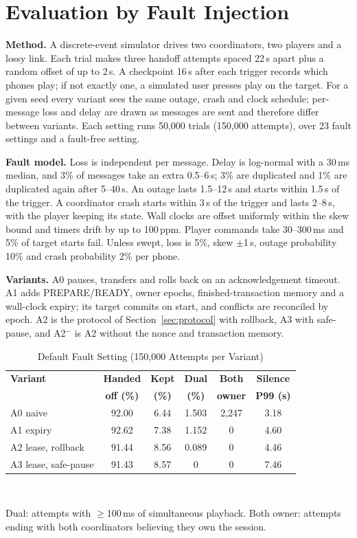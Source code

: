 \documentclass[conference]{IEEEtran}
\begin{document}
\section{Evaluation by Fault Injection}\label{sec:faulteval}

\textbf{Method.} A discrete-event simulator drives two coordinators, two players and a lossy link. Each trial makes three handoff attempts spaced 22\,s apart plus a random offset of up to 2\,s. A checkpoint 16\,s after each trigger records which phones play; if not exactly one, a simulated user presses play on the target. For a given seed every variant sees the same outage, crash and clock schedule; per-message loss and delay are drawn as messages are sent and therefore differ between variants. Each setting runs 50{,}000 trials (150{,}000 attempts), over 23 fault settings and a fault-free setting.

\textbf{Fault model.} Loss is independent per message. Delay is log-normal with a 30\,ms median, and 3\% of messages take an extra 0.5--6\,s; 3\% are duplicated and 1\% are duplicated again after 5--40\,s. An outage lasts 1.5--12\,s and starts within 1.5\,s of the trigger. A coordinator crash starts within 3\,s of the trigger and lasts 2--8\,s, with the player keeping its state. Wall clocks are offset uniformly within the skew bound and timers drift by up to 100\,ppm. Player commands take 30--300\,ms and 5\% of target starts fail. Unless swept, loss is 5\%, skew $\pm$1\,s, outage probability 10\% and crash probability 2\% per phone.

\textbf{Variants.} A0 pauses, transfers and rolls back on an acknowledgement timeout. A1 adds PREPARE/READY, owner epochs, finished-transaction memory and a wall-clock expiry; its target commits on start, and conflicts are reconciled by epoch. A2 is the protocol of Section~\ref{sec:protocol} with rollback, A3 with safe-pause, and A2$^-$ is A2 without the nonce and transaction memory.

\begin{table}[t]
\caption{Default Fault Setting (150{,}000 Attempts per Variant)}
\label{tab:default}
\centering
\footnotesize
\begin{tabular}{@{}lccccc@{}}
\toprule
\textbf{Variant} & \textbf{Handed} & \textbf{Kept} & \textbf{Dual} & \textbf{Both} & \textbf{Silence} \\
 & \textbf{off (\%)} & \textbf{(\%)} & \textbf{(\%)} & \textbf{owner} & \textbf{P99 (s)} \\
\midrule
A0 naive & 92.00 & 6.44 & 1.503 & 2{,}247 & 3.18 \\
A1 expiry & 92.62 & 7.38 & 1.152 & 0 & 4.60 \\
A2 lease, rollback & 91.44 & 8.56 & 0.089 & 0 & 4.46 \\
A3 lease, safe-pause & 91.43 & 8.57 & 0 & 0 & 7.46 \\
\bottomrule
\end{tabular}
\\[2pt]
\parbox{\columnwidth}{\scriptsize Dual: attempts with $\ge$100\,ms of simultaneous playback. Both owner: attempts ending with both coordinators believing they own the session.}
\end{table}
\end{document}
